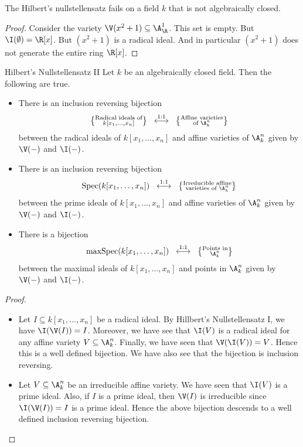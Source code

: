 \documentclass[a4paper]{article}
\begin{document}
\begin{eg}{}{} The Hilbert's nullstellensatz fails on a field $k$ that is not algebraically closed. 
\begin{proof}
Consider the variety $\V(x^2+1)\subseteq\A_\R^1$. This set is empty. But $\I(\emptyset)=\R[x]$. But $(x^2+1)$ is a radical ideal. And in particular $(x^2+1)$ does not generate the entire ring $\R[x]$. 
\end{proof}
\end{eg}

\begin{thm}{Hilbert's Nullstellensatz II}{} Let $k$ be an algebraically closed field. Then the following are true. 
\begin{itemize}
\item There is an inclusion reversing bijection $$\left\{\substack{\text{Radical ideals of}\\ k[x_1,\dots,x_n]}\right\}\;\;\overset{\text{1:1}}{\longleftrightarrow}\;\;\left\{\substack{\text{Affine varieties}\\\text{of }\A_k^n}\right\}$$ between the radical ideals of $k[x_1,\dots,x_n]$ and affine varieties of $\A_k^n$ given by $\V(-)$ and $\I(-)$. 
\item There is an inclusion reversing bijection $$\text{Spec}(k[x_1,\dots,x_n])\;\;\overset{\text{1:1}}{\longleftrightarrow}\;\;\left\{\substack{\text{Irreducible affine}\\\text{varieties of }\A_k^n}\right\}$$ between the prime ideals of $k[x_1,\dots,x_n]$ and affine varieties of $\A_k^n$ given by $\V(-)$ and $\I(-)$. 
\item There is a bijection $$\text{maxSpec}(k[x_1,\dots,x_n])\;\;\overset{\text{1:1}}{\longleftrightarrow}\;\;\left\{\substack{\text{Points in}\\\A_k^n}\right\}$$ between the maximal ideals of $k[x_1,\dots,x_n]$ and points in $\A_k^n$ given by $\V(-)$ and $\I(-)$. 
\end{itemize} 
\begin{proof}~\\
\begin{itemize}
\item Let $I\subseteq k[x_1,\dots,x_n]$ be a radical ideal. By Hillbert's Nullstellensatz I, we have $\I(\V(I))=I$. Moreover, we have see that $\I(V)$ is a radical ideal for any affine variety $V\subseteq\A_k^n$. Finally, we have seen that $\V(\I(V))=V$. Hence this is a well defined bijection. We have also see that the bijection is inclusion reversing. 
\item Let $V\subseteq\A_k^n$ be an irreducible affine variety. We have seen that $\I(V)$ is a prime ideal. Also, if $I$ is a prime ideal, then $\V(I)$ is irreducible since $\I(\V(I))=I$ is a prime ideal. Hence the above bijection descends to a well defined inclusion reversing bijection. 

\end{itemize}
\end{proof}
\end{thm}
\end{document}
